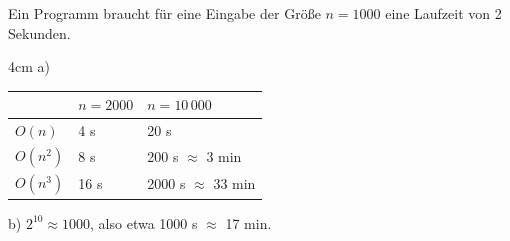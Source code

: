 \question[3]
Ein Programm braucht für eine Eingabe der Größe $n = 1000$ eine Laufzeit von 2 Sekunden.
\begin{solutionbox}{4cm}
a)\par\smallskip
\begin{tabular}{lll}
 & $n = 2000$ & $n = 10\,000$ \\ \hline
$O(n)$ & 4 s & 20 s \\
$O(n^2)$ & 8 s & 200 s $\approx$ 3 min \\
$O(n^3)$ & 16 s & 2000 s $\approx$ 33 min \\
\end{tabular}

b) $2^{10} \approx 1000$, also etwa 1000 s $\approx$ 17 min.
\end{solutionbox}

